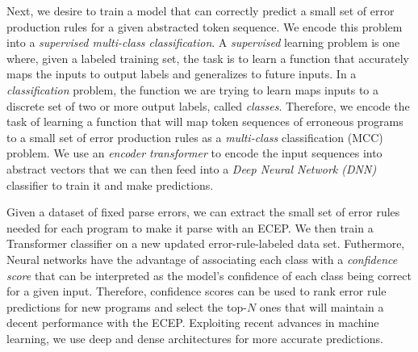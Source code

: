  Next, we desire to train a model that can
correctly predict a small set of error production rules for a given abstracted
token sequence. We encode this problem into a \emph{supervised multi-class
classification}. A \emph{supervised} learning problem is one where, given a
labeled training set, the task is to learn a function that accurately maps the
inputs to output labels and generalizes to future inputs. In a
\emph{classification} problem, the function we are trying to learn maps inputs
to a discrete set of two or more output labels, called \emph{classes}.
Therefore, we encode the task of learning a function that will map token
sequences of erroneous programs to a small set of error production rules as a
\emph{multi-class} classification (MCC) problem. We use an \emph{encoder
transformer} to encode the input sequences into abstract vectors that we can
then feed into a \emph{Deep Neural Network (DNN)} classifier to train it and
make predictions.

Given a dataset of fixed parse errors, we can extract the small set of error
rules needed for each program to make it parse with an ECEP. We then train a
Transformer classifier on a new updated error-rule-labeled data set. Futhermore,
Neural networks have the advantage of associating each class with a
\emph{confidence score} that can be interpreted as the model's confidence of
each class being correct for a given input. Therefore, confidence scores can be
used to rank error rule predictions for new programs and select the top-$N$ ones
that will maintain a decent performance with the ECEP. Exploiting recent
advances in machine learning, we use deep and dense architectures
\citep{Schmidhuber_2015} for more accurate predictions.
